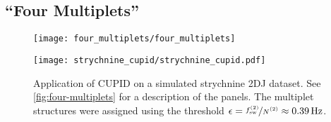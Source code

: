 \subsection{``Four Multiplets''}
\label{subsec:four-mp}
\begin{figure}
    \centering
    \texttt{[image: four\_multiplets/four\_multiplets]}
    \caption[
        The result of applying \acs{CUPID} to 5 instances of simulated
        \acs{2DJ} datasets with 4 heavily overlapping multiplet structures.
    ]{
        The result of applying \ac{CUPID} to 5 instances of simulated \ac{2DJ}
        datasets with 4 heavily overlapping multiplet structures.
        \textbf{a.} Black: pure shift spectrum generated by \ac{CUPID} (via the
        \ang{-45} signal).
        Grey: \ac{1D} spectrum simulated with \textsc{Spinach}, using the same spin
        system as was used to produce the \ac{2DJ} dataset, but with all scalar
        couplings set to \qty{0}{\hertz}. This has been offset slightly for
        clarity.
        \textbf{b.} \ac{1D} spectrum of the dataset, produced using the first
        direct-dimension \ac{FID} in the \ac{2DJ} dataset.
        \textbf{c.} Multiplet structures predicted, using a threshold $\epsilon
        = \nicefrac{\fswtwo}{\Ntwo} \approx \qty{0.98}{\hertz}$.
        \textbf{d.} Contour plot of the \ac{2DJ} spectrum in magnitude-mode,
        with coloured points denoting the frequencies of oscillators in the
        estimation result. The coloured vertical lines denote the predicted
        central frequencies of each multiplet structure.
    }
    \label{fig:four-multiplets}
    \vspace{20pt}
    \texttt{[image: strychnine\_cupid/strychnine\_cupid.pdf]}
    \caption[
        Application of \acs{CUPID} on a simulated strychnine \acs{2DJ} dataset.
    ]
    {
        Application of \ac{CUPID} on a simulated strychnine \ac{2DJ} dataset.
        See \cref{fig:four-multiplets} for a description of the panels.
        The multiplet structures were assigned using the threshold
        $\epsilon = \nicefrac{\fswtwo}{\Ntwo} \approx \qty{0.39}{\hertz}$.
    }
    \label{fig:strychnine-cupid}
\end{figure}

